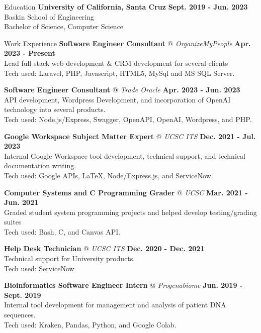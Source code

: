 \documentclass{resume} %
\begin{document}
\begin{rSection}{Education}
    \textbf{University of California, Santa Cruz}
    \hfill{\textbf {Sept. 2019 - Jun. 2023}}
    \\ Baskin School of Engineering
    \\ Bachelor of Science, Computer Science
\end{rSection}

\begin{rSection}{Work Experience}
    {\textbf{Software Engineer Consultant} @ \textit{OrganizeMyPeople}}
    \hfill{\textbf {Apr. 2023 - Present}}
    \\ Lead full stack web development \& CRM development for several clients
    \\ Tech used: Laravel, PHP, Javascript, HTML5, MySql and MS SQL Server.

    \textbf{Software Engineer Consultant} @  \textit{Trade Oracle}
    \hfill{\textbf {Apr. 2023 - Jun. 2023}}
    \\ API development, Wordpress Development, and incorporation of OpenAI technology into several products.
    \\ Tech used: Node.js/Express, Swagger, OpenAPI, OpenAI, Wordpress, and PHP. 

    {\textbf{Google Workspace Subject Matter Expert} @ \textit{UCSC ITS} }
    \hfill{\textbf {Dec. 2021 - Jul. 2023}}
    \\ Internal Google Workspace tool development, technical support, and technical documentation writing.
    \\ Tech used: Google APIs, LaTeX, Node/Express.js, and ServiceNow.


    {\textbf{Computer Systems and C Programming Grader} @ \textit{UCSC} }
    \hfill{\textbf {Mar. 2021 - Jun. 2021}}
    \\ Graded student system programming projects and helped develop testing/grading suites
    \\ Tech used: Bash, C, and Canvas API.

    {\textbf{Help Desk Technician} @ \textit{UCSC ITS}}
    \hfill{\textbf {Dec. 2020 - Dec. 2021}}
    \\ Technical support for University products.
    \\ Tech used: ServiceNow

    {\textbf{Bioinformatics Software Engineer Intern} @ \textit{Progenabiome}}
    \hfill{\textbf {Jun. 2019 - Sept. 2019}}
    \\ Internal tool development for management and analysis of patient DNA sequences.
    \\ Tech used: Kraken, Pandas, Python, and Google Colab.
\end{rSection}
\end{document}
